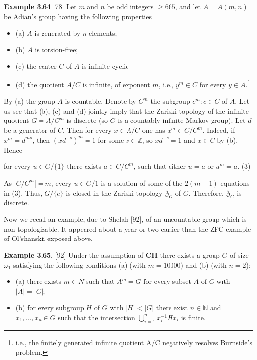 \documentclass[12pt]{article}
\begin{document}
    \textbf{Example 3.64} [78] Let $m$ and $n$ be odd integers $\geq 665$, and let $A = A(m, n)$ be Adian’s group having the
    following properties


    \begin{itemize}

        \item (a) $A$ is generated by $n$-elements;

        \item (b) $A$ is torsion-free;

        \item (c) the center $C$ of $A$ is infinite cyclic

        \item (d) the quotient $A/C$ is infinite, of exponent $m$, i.e., $y^m \in C$ for every $y \in A$.\footnote[6]{i.e., the finitely generated infinite quotient A/C negatively resolves Burnside's problem.}
    
    \end{itemize}


        By (a) the group $A$ is countable. Denote by $C^m$ the subgroup ${c^m : c \in C}$ of $A$. Let us see that (b), (c) and
    (d) jointly imply that the Zariski topology of the infinite quotient $G = A/C^m$ is discrete (so $G$ is a countably
    infinite Markov group). Let $d$ be a generator of $C$. Then for every $x \in A/C$ one has $x^m \in C/C^m$. Indeed, if
    $x^m = d^{ms}$, then $(xd^{-s})^m = 1$ for some $s \in \mathbb{Z}$, so $xd^{-s} = 1$ and $x \in C$ by (b). Hence


    for every $u \in G / \{1\}$ there exists $a \in C/C^m$, such that either $u = a$ or $u^m = a$. (3)


        As $|C/C^m| = m$, every $u \in G/{1}$ is a solution of some of the $2(m - 1)$ equations in (3). Thus, $G/\{e\}$ is closed
    in the Zariski topology $\mathfrak{Z}_G$ of $G$. Therefore, $\mathfrak{Z}_G$ is discrete.


        Now we recall an example, due to Shelah [92], of an uncountable group which is non-topologizable. It
    appeared about a year or two earlier than the ZFC-example of Ol'shanskii exposed above.


    \textbf{Example 3.65}. [92] Under the assumption of \textbf{CH} there exists a group $G$ of size $\omega_1$ satisfying the following
    conditions (a) (with $m = 10000$) and (b) (with $n = 2$):
    

    \begin{itemize}

        \item (a) there exists $m \in N$ such that $A^m = G$ for every subset $A$ of $G$ with $|A| = |G|$;

        \item (b) for every subgroup $H$ of $G$ with $|H| < |G|$ there exist $n \in \mathbb{N}$ and $x_1, . . . , x_n \in G$ such that the intersection
        $\bigcup^n_{i=1} x^{-1}_i Hx_i$ is finite.

    \end{itemize}
\end{document}
